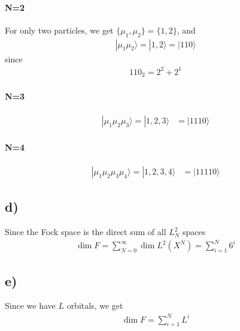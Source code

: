 \documentclass[norsk, 12pt]{article}
\newcommand{\ra}{\rangle}
\begin{document}
\paragraph{N=2}
For only two particles, we get $\{\mu_1,\mu_2\} = \{1,2\}$, and
\begin{align*}
	|\mu_1 \mu_2\ra = |1,2\ra = |110\ra
\end{align*}
since
\begin{align*}
	110_2 = 2^2 + 2^1
\end{align*}

\paragraph{N=3}
\begin{align*}
	|\mu_1 \mu_2 \mu_3\ra = |1,2,3\ra &= |1110\ra
\end{align*}

\paragraph{N=4}
\begin{align*}
	|\mu_1 \mu_2 \mu_3 \mu_4\ra = |1,2,3,4\ra &= |11110\ra
\end{align*}

\subsection*{d)}
\label{sub:1.13d}
Since the Fock space is the direct sum of all $L^2_N$ spaces
\begin{align*}
	\dim F = \sum_{N=0}^{\infty}\dim L^2(X^N) = \sum_{i=1}^{N} 6^i
\end{align*}

\subsection*{e)}
\label{sub:1.13e}
Since we have $L$ orbitals, we get
\begin{align*}
	\dim F = \sum_{i=1}^{N} L^i
\end{align*}
\end{document}
